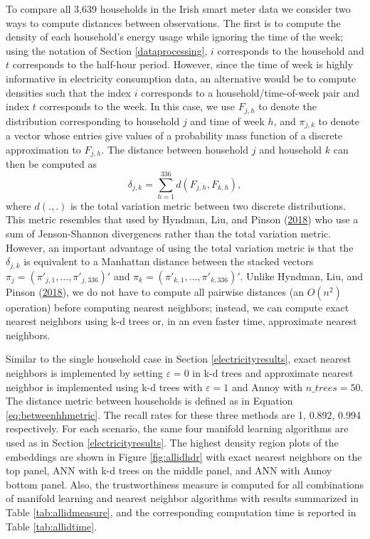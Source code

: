 \documentclass[12pt]{article}
\begin{document}
To compare all 3,639 households in the Irish smart meter data we consider two ways to compute distances between observations. The first is to compute the density of each household's energy usage while ignoring the time of the week; using the notation of Section \ref{dataprocessing}, \(i\) corresponds to the household and \(t\) corresponds to the half-hour period. However, since the time of week is highly informative in electricity consumption data, an alternative would be to compute densities such that the index \(i\) corresponds to a household/time-of-week pair and index \(t\) corresponds to the week. In this case, we use \(F_{j,h}\) to denote the distribution corresponding to household \(j\) and time of week \(h\), and \(\pi_{j,k}\) to denote a vector whose entries give values of a probability mass function of a discrete approximation to \(F_{j,h}\). The distance between household \(j\) and household \(k\) can then be computed as
\begin{equation}\label{eq:betweenhhmetric}
  \delta_{j,k}=\sum\limits_{h=1}^{336}d(F_{j,h},F_{k,h}),
\end{equation}
where \(d(.,.)\) is the total variation metric between two discrete distributions. This metric resembles that used by Hyndman, Liu, and Pinson (\protect\hyperlink{ref-Hyndman2018-nq}{2018}) who use a sum of Jenson-Shannon divergences rather than the total variation metric. However, an important advantage of using the total variation metric is that the \(\delta_{j,k}\) is equivalent to a Manhattan distance between the stacked vectors \(\pi_j=(\pi'_{j,1},\ldots,\pi'_{j,336})'\) and \(\pi_k=(\pi'_{k,1},\ldots,\pi'_{k,336})'\). Unlike Hyndman, Liu, and Pinson (\protect\hyperlink{ref-Hyndman2018-nq}{2018}), we do not have to compute all pairwise distances (an \(O(n^2)\) operation) before computing nearest neighbors; instead, we can compute exact nearest neighbors using k-d trees or, in an even faster time, approximate nearest neighbors.

Similar to the single household case in Section \ref{electricityresults}, exact nearest neighbors is implemented by setting \(\varepsilon=0\) in k-d trees and approximate nearest neighbor is implemented using k-d trees with \(\varepsilon=1\) and Annoy with \(\textit{n\_trees}=50\). The distance metric between households is defined as in Equation \eqref{eq:betweenhhmetric}. The recall rates for these three methods are 1, 0.892, 0.994 respectively. For each scenario, the same four manifold learning algorithms are used as in Section \ref{electricityresults}. The highest density region plots of the embeddings are shown in Figure \ref{fig:allidhdr} with exact nearest neighbors on the top panel, ANN with k-d trees on the middle panel, and ANN with Annoy bottom panel. Also, the trustworthiness measure is computed for all combinations of manifold learning and nearest neighbor algorithms with results summarized in Table \ref{tab:allidmeasure}, and the corresponding computation time is reported in Table \ref{tab:allidtime}.
\end{document}
